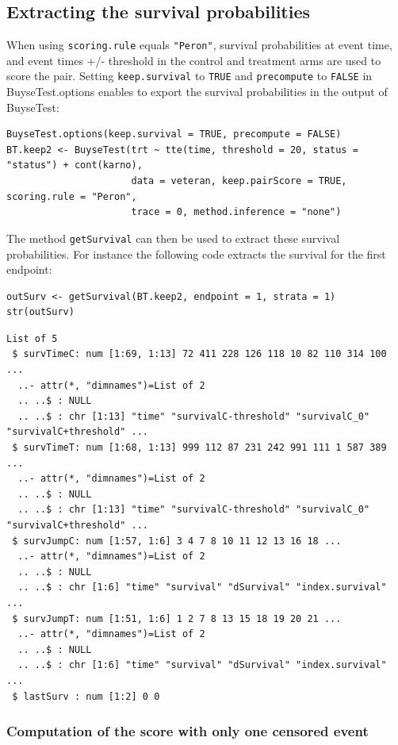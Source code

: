 \documentclass[12pt]{article}
\begin{document}
\subsection{Extracting the survival probabilities}
\label{sec:orge845243}
When using \texttt{scoring.rule} equals \texttt{"Peron"}, survival probabilities at
event time, and event times +/- threshold in the control and treatment
arms are used to score the pair. Setting \texttt{keep.survival} to \texttt{TRUE} and
\texttt{precompute} to \texttt{FALSE} in BuyseTest.options enables to export the
survival probabilities in the output of BuyseTest:
\lstset{language=r,label= ,caption= ,captionpos=b,numbers=none}
\begin{lstlisting}
BuyseTest.options(keep.survival = TRUE, precompute = FALSE)
BT.keep2 <- BuyseTest(trt ~ tte(time, threshold = 20, status = "status") + cont(karno),
                      data = veteran, keep.pairScore = TRUE, scoring.rule = "Peron",
                      trace = 0, method.inference = "none")
\end{lstlisting}

The method \texttt{getSurvival} can then be used to extract these survival
probabilities. For instance the following code extracts the survival
for the first endpoint:
\lstset{language=r,label= ,caption= ,captionpos=b,numbers=none}
\begin{lstlisting}
outSurv <- getSurvival(BT.keep2, endpoint = 1, strata = 1)
str(outSurv)
\end{lstlisting}

\begin{verbatim}
List of 5
 $ survTimeC: num [1:69, 1:13] 72 411 228 126 118 10 82 110 314 100 ...
  ..- attr(*, "dimnames")=List of 2
  .. ..$ : NULL
  .. ..$ : chr [1:13] "time" "survivalC-threshold" "survivalC_0" "survivalC+threshold" ...
 $ survTimeT: num [1:68, 1:13] 999 112 87 231 242 991 111 1 587 389 ...
  ..- attr(*, "dimnames")=List of 2
  .. ..$ : NULL
  .. ..$ : chr [1:13] "time" "survivalC-threshold" "survivalC_0" "survivalC+threshold" ...
 $ survJumpC: num [1:57, 1:6] 3 4 7 8 10 11 12 13 16 18 ...
  ..- attr(*, "dimnames")=List of 2
  .. ..$ : NULL
  .. ..$ : chr [1:6] "time" "survival" "dSurvival" "index.survival" ...
 $ survJumpT: num [1:51, 1:6] 1 2 7 8 13 15 18 19 20 21 ...
  ..- attr(*, "dimnames")=List of 2
  .. ..$ : NULL
  .. ..$ : chr [1:6] "time" "survival" "dSurvival" "index.survival" ...
 $ lastSurv : num [1:2] 0 0
\end{verbatim}

\subsubsection{Computation of the score with only one censored event}
\label{sec:org341f46e}
\end{document}
